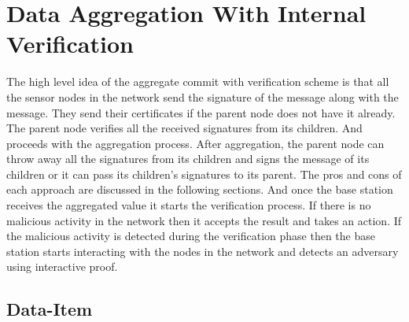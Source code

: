 \chapter{Data Aggregation With Internal Verification} %
\label{cha:Data Aggregation With Internal Verification}

	The high level idea of the aggregate commit with verification scheme is that all the sensor nodes in the network send the signature of the message along with the message.
	They send their certificates if the parent node does not have it already.
	The parent node verifies all the received signatures from its children.
	And proceeds with the aggregation process.
	After aggregation, the parent node can throw away all the signatures from its children and signs the message of its children or it can pass its children's signatures to its parent. 
	The pros and cons of each approach are discussed in the following sections. 
	And once the base station receives the aggregated value it starts the verification process. 
	If there is no malicious activity in the network then  it accepts the result and takes an action.
	If the malicious activity is detected during the verification phase then the base station starts interacting with the nodes in the network and detects an adversary using interactive proof. 

\section{Data-Item}
	
